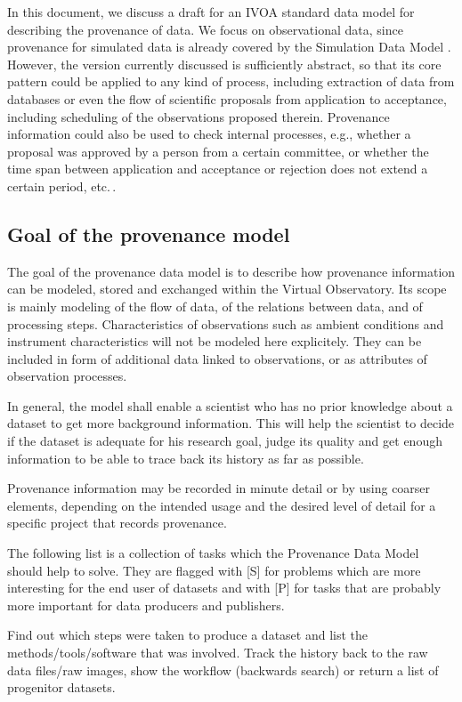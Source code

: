 In this document, we discuss a draft for an IVOA standard data model for
describing the provenance of data. We focus on observational data, since
provenance for simulated data is already covered by the Simulation Data Model
\citep[SimDM,][]{std:SimDM}. However, the version currently discussed is
sufficiently abstract, so that its core pattern could be applied to any kind
of process, including extraction of data from 
databases or even the flow of scientific proposals from application to 
acceptance, including scheduling of the observations proposed therein.
Provenance information could also be used to check internal processes,
e.g., whether a proposal was approved by a person from a certain committee,
or whether the time span between application and acceptance or rejection
does not extend a certain period, etc.\,. 


\subsection{Goal of the provenance model}\label{sec:goals}
The goal of the provenance data model is to describe how provenance information
can be modeled, stored and exchanged within the Virtual Observatory. Its scope
is mainly modeling of the flow of data, of the relations between data,
and of processing steps. Characteristics of observations such as ambient
conditions and instrument characteristics will not be modeled here
explicitely. They can be included in form of additional data linked to
observations, or as attributes of observation processes.

In general, the model shall enable a scientist who has no prior knowledge about
a dataset to get more 
background information. This will help the scientist to decide if the dataset 
is adequate for his research goal, judge its quality and get enough information
to be able to trace back its history as far as possible. 

Provenance information may be recorded in minute detail or by using coarser
elements, depending on the intended usage and the desired level of detail
for a specific project that records provenance.

The following list is a collection of tasks which the Provenance Data Model should help to solve. They are flagged with [S] for problems which are more interesting for the end user of datasets and with [P] for tasks that are probably more important for data producers and publishers.

        Find out which steps were taken to produce a dataset and list the methods/tools/software that was involved. 
        Track the history back to the raw data files/raw images, show the workflow (backwards search) or return a list of progenitor datasets.

